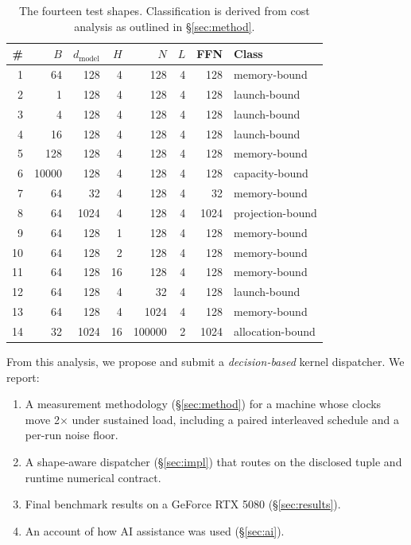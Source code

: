 \documentclass[10pt,conference,compsoc]{IEEEtran}
\begin{document}
\begin{table}[H]
\centering
\scriptsize
\begin{tabular}{r r r r r r r l}
\hline
\textbf{\#} & \textbf{$B$} & \textbf{$d_\text{model}$} & \textbf{$H$} & \textbf{$N$} & \textbf{$L$} & \textbf{FFN} & \textbf{Class} \\
\hline
1  & 64     & 128  & 4  & 128     & 4 & 128  & memory-bound \\
2  & 1      & 128  & 4  & 128     & 4 & 128  & launch-bound \\
3  & 4      & 128  & 4  & 128     & 4 & 128  & launch-bound \\
4  & 16     & 128  & 4  & 128     & 4 & 128  & launch-bound \\
5  & 128    & 128  & 4  & 128     & 4 & 128  & memory-bound \\
6  & 10000  & 128  & 4  & 128     & 4 & 128  & capacity-bound \\
7  & 64     & 32   & 4  & 128     & 4 & 32   & memory-bound \\
8  & 64     & 1024 & 4  & 128     & 4 & 1024 & projection-bound \\
9  & 64     & 128  & 1  & 128     & 4 & 128  & memory-bound \\
10 & 64     & 128  & 2  & 128     & 4 & 128  & memory-bound \\
11 & 64     & 128  & 16 & 128     & 4 & 128  & memory-bound \\
12 & 64     & 128  & 4  & 32      & 4 & 128  & launch-bound \\
13 & 64     & 128  & 4  & 1024    & 4 & 128  & memory-bound \\
14 & 32     & 1024 & 16 & 100000  & 2 & 1024 & allocation-bound \\
\hline
\end{tabular}
\vspace{6pt}
\caption{The fourteen test shapes. Classification is derived from cost analysis as outlined in \S\ref{sec:method}.}
\label{tab:shapes}
\end{table}

From this analysis, we propose and submit a \emph{decision-based} kernel dispatcher. We report:

\begin{enumerate}
    \item A measurement methodology (\S\ref{sec:method}) for a machine whose clocks move 2$\times$ under sustained load, including a paired interleaved schedule and a per-run noise floor.
    \item A shape-aware dispatcher (\S\ref{sec:impl}) that routes on the disclosed tuple and runtime numerical contract.
    \item Final benchmark results on a GeForce RTX 5080 (\S\ref{sec:results}).
    \item An account of how AI assistance was used (\S\ref{sec:ai}).
\end{enumerate}
\end{document}
